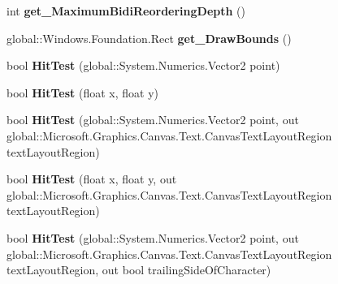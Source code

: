 \begin{DoxyCompactItemize}
int {\bfseries get\+\_\+\+Maximum\+Bidi\+Reordering\+Depth} ()
\item 
\mbox{\label{interface_microsoft_1_1_graphics_1_1_canvas_1_1_text_1_1_i_canvas_text_layout_a4025e4ade30314f817baa66bd51ff1a2}} 
global\+::\+Windows.\+Foundation.\+Rect {\bfseries get\+\_\+\+Draw\+Bounds} ()
\item 
\mbox{\label{interface_microsoft_1_1_graphics_1_1_canvas_1_1_text_1_1_i_canvas_text_layout_a2151faef30105a2fa20e7fc83746089c}} 
bool {\bfseries Hit\+Test} (global\+::\+System.\+Numerics.\+Vector2 point)
\item 
\mbox{\label{interface_microsoft_1_1_graphics_1_1_canvas_1_1_text_1_1_i_canvas_text_layout_a25b988998378e67ba732e8d3e69b1f51}} 
bool {\bfseries Hit\+Test} (float x, float y)
\item 
\mbox{\label{interface_microsoft_1_1_graphics_1_1_canvas_1_1_text_1_1_i_canvas_text_layout_adeb4ec733847627d081e70843cf372ec}} 
bool {\bfseries Hit\+Test} (global\+::\+System.\+Numerics.\+Vector2 point, out global\+::\+Microsoft.\+Graphics.\+Canvas.\+Text.\+Canvas\+Text\+Layout\+Region text\+Layout\+Region)
\item 
\mbox{\label{interface_microsoft_1_1_graphics_1_1_canvas_1_1_text_1_1_i_canvas_text_layout_a1620bdefefce95ef2ae5525645e72e66}} 
bool {\bfseries Hit\+Test} (float x, float y, out global\+::\+Microsoft.\+Graphics.\+Canvas.\+Text.\+Canvas\+Text\+Layout\+Region text\+Layout\+Region)
\item 
\mbox{\label{interface_microsoft_1_1_graphics_1_1_canvas_1_1_text_1_1_i_canvas_text_layout_ae4c70cf259e0ada5180a328f0e176122}} 
bool {\bfseries Hit\+Test} (global\+::\+System.\+Numerics.\+Vector2 point, out global\+::\+Microsoft.\+Graphics.\+Canvas.\+Text.\+Canvas\+Text\+Layout\+Region text\+Layout\+Region, out bool trailing\+Side\+Of\+Character)

\end{DoxyCompactItemize}
